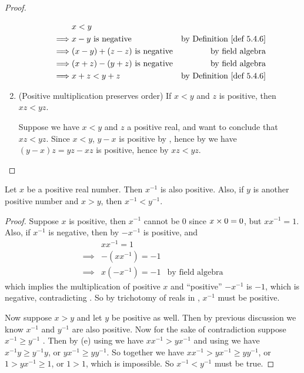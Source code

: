\begin{proof}
\begin{enumerate}
        \begin{align*}
                     & x < y \\
            \implies & x - y \text{ is negative} & \text{by \DEF{5.4.6}} \\
            \implies & (x - y) + (z - z) \text{ is negative} & \text{by field algebra} \\
            \implies & (x + z) - (y + z) \text{ is negative} & \text{by field algebra} \\
            \implies & x + z < y + z & \text{by \DEF{5.4.6}}
        \end{align*}
    \item (Positive multiplication preserves order) If \(x < y\) and \(z\) is positive, then \(xz < yz\).

        Suppose we have \(x < y\) and \(z\) a positive real, and want to conclude that \(xz < yz\).
        Since \(x < y\), \(y - x\) is positive by , hence by  we have \((y - x)z = yz - xz\) is positive, hence by  \(xz < yz\).
\end{enumerate}
\end{proof}

\begin{proposition} \label{prop 5.4.8}
Let \(x\) be a positive real number.
Then \(x^{-1}\) is also positive.
Also, if \(y\) is another positive number and \(x > y\), then \(x^{-1} < y^{-1}\).
\end{proposition}

\begin{proof}
Suppose \(x\) is positive, then \(x^{-1}\) cannot be \(0\) since \(x \times 0 = 0\), but \(xx^{-1} = 1\).
Also, if \(x^{-1}\) is negative, then by  \(-x^{-1}\) is positive, and
\begin{align*}
             & xx^{-1} = 1 \\
    \implies & -(xx^{-1}) = -1 \\
    \implies & x(-x^{-1}) = -1 & \text{by field algebra}
\end{align*}
which implies the multiplication of positive \(x\) and ``positive'' \(-x^{-1}\) is \(-1\), which is negative, contradicting .
So by trichotomy of reals in , \(x^{-1}\) must be positive.

Now suppose \(x > y\)  and let \(y\) be positive  as well.
Then by previous discussion we know \(x^{-1}\)  and \(y^{-1}\) are also positive.
Now for the sake of contradiction suppose \(x^{-1} \ge y^{-1}\) .
Then by (e) using  we have \(xx^{-1} > yx^{-1}\) and using  we have \(x^{-1}y \ge y^{-1}y\), or \(yx^{-1} \ge yy^{-1}\).
So together we have \(xx^{-1} > yx^{-1} \ge yy^{-1}\), or \(1 > yx^{-1} \ge 1\), or \(1 > 1\), which is impossible.
So \(x^{-1} < y^{-1}\) must be true.
\end{proof}

